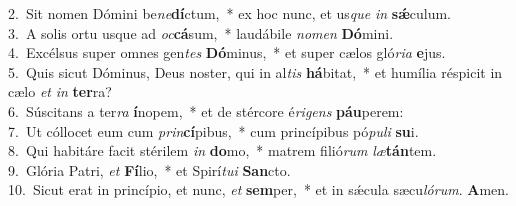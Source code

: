 {2.~}Sit nomen Dómini be\textit{ne}\textbf{dí}ctum,~* ex hoc nunc, et us\textit{que} \textit{in} \textbf{sǽ}culum.\\
{3.~}A solis ortu usque ad \textit{oc}\textbf{cá}sum,~* laudábile \textit{no}\textit{men} \textbf{Dó}mini.\\
{4.~}Excélsus super omnes gen\textit{tes} \textbf{Dó}minus,~* et super cælos gló\textit{ri}\textit{a} \textbf{e}jus.\\
{5.~}Quis sicut Dóminus, Deus noster, qui in al\textit{tis} \textbf{há}bitat,~* et humília réspicit in cælo \textit{et} \textit{in} \textbf{ter}ra?\\
{6.~}Súscitans a ter\textit{ra} \textbf{í}nopem,~* et de stércore é\textit{ri}\textit{gens} \textbf{páu}perem:\\
{7.~}Ut cóllocet eum cum \textit{prin}\textbf{cí}pibus,~* cum princípibus pó\textit{pu}\textit{li} \textbf{su}i.\\
{8.~}Qui habitáre facit stérilem \textit{in} \textbf{do}mo,~* matrem filió\textit{rum} \textit{læ}\textbf{tán}tem.\\
{9.~}Glória Patri, \textit{et} \textbf{Fí}lio,~* et Spirí\textit{tu}\textit{i} \textbf{San}cto.\\
{10.~}Sicut erat in princípio, et nunc, \textit{et} \textbf{sem}per,~* et in sǽcula sæcu\textit{ló}\textit{rum}. \textbf{A}men.\\
